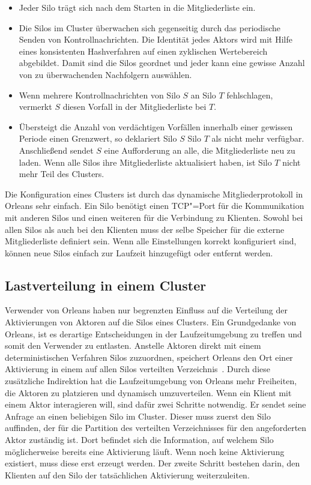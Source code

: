 \begin{itemize}
	\item Jeder Silo trägt sich nach dem Starten in die Mitgliederliste ein.
	\item Die Silos im Cluster überwachen sich gegenseitig durch das periodische Senden von Kontrollnachrichten. Die Identität jedes Aktors wird mit Hilfe eines konsistenten Hashverfahren auf einen zyklischen Wertebereich abgebildet. Damit sind die Silos geordnet und jeder kann eine gewisse Anzahl von zu überwachenden Nachfolgern auswählen.
	\item Wenn mehrere Kontrollnachrichten von Silo $S$ an Silo $T$ fehlschlagen, vermerkt $S$ diesen Vorfall in der Mitgliederliste bei $T$.
	\item Übersteigt die Anzahl von verdächtigen Vorfällen innerhalb einer gewissen Periode einen Grenzwert, so deklariert Silo $S$ Silo $T$ als nicht mehr verfügbar. Anschließend sendet $S$ eine Aufforderung an alle, die Mitgliederliste neu zu laden. Wenn alle Silos ihre Mitgliederliste aktualisiert haben, ist Silo $T$ nicht mehr Teil des Clusters.
\end{itemize}

Die Konfiguration eines Clusters ist durch das dynamische Mitgliederprotokoll in Orleans sehr einfach. Ein Silo benötigt einen TCP"=Port für die Kommunikation mit anderen Silos und einen weiteren für die Verbindung zu Klienten. Sowohl bei allen Silos als auch bei den Klienten muss der selbe Speicher für die externe Mitgliederliste definiert sein. Wenn alle Einstellungen korrekt konfiguriert sind, können neue Silos einfach zur Laufzeit hinzugefügt oder entfernt werden.

\subsection{Lastverteilung in einem Cluster}

Verwender von Orleans haben nur begrenzten Einfluss auf die Verteilung der Aktivierungen von Aktoren auf die Silos eines Clusters. Ein Grundgedanke von Orleans, ist es derartige Entscheidungen in der Laufzeitumgebung zu treffen und somit den Verwender zu entlasten. Anstelle Aktoren direkt mit einem deterministischen Verfahren Silos zuzuordnen, speichert Orleans den Ort einer Aktivierung in einem auf allen Silos verteilten Verzeichnis~\cite[5]{virtualActors}. Durch diese zusätzliche Indirektion hat die Laufzeitumgebung von Orleans mehr Freiheiten, die Aktoren zu platzieren und dynamisch umzuverteilen. Wenn ein Klient mit einem Aktor interagieren will, sind dafür zwei Schritte notwendig. Er sendet seine Anfrage an einen beliebigen Silo im Cluster. Dieser muss zuerst den Silo auffinden, der für die Partition des verteilten Verzeichnisses für den angeforderten Aktor zuständig ist. Dort befindet sich die Information, auf welchem Silo möglicherweise bereits eine Aktivierung läuft. Wenn noch keine Aktivierung existiert, muss diese erst erzeugt werden. Der zweite Schritt bestehen darin, den Klienten auf den Silo der tatsächlichen Aktivierung weiterzuleiten.

